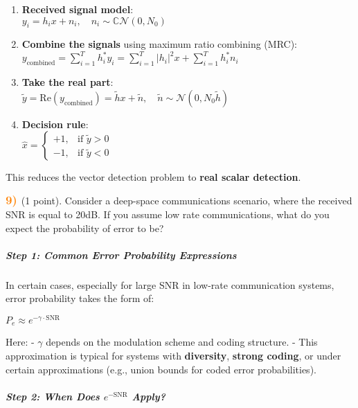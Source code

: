 \documentclass[11pt]{article}
\begin{document}
\begin{enumerate}
\def\labelenumi{\arabic{enumi}.}
\item
  \textbf{Received signal model}:\\
  \(y_i = h_i x + n_i, \quad n_i \sim \mathbb{C}\mathcal{N}(0, N_0)\)
\item
  \textbf{Combine the signals} using maximum ratio combining (MRC):\\
  \(y_{\text{combined}} = \sum_{i=1}^{T} h_i^* y_i = \sum_{i=1}^{T} |h_i|^2 x + \sum_{i=1}^{T} h_i^* n_i\)
\item
  \textbf{Take the real part}:\\
  \(\tilde{y} = \text{Re}(y_{\text{combined}}) = \tilde{h} x + \tilde{n}, \quad \tilde{n} \sim \mathcal{N}(0, N_0 \tilde{h})\)
\item
  \textbf{Decision rule}:\\
  \(\boxed{\hat{x} = \begin{cases} +1, & \text{if } \tilde{y} > 0 \\ -1, & \text{if } \tilde{y} < 0 \end{cases}}\)
\end{enumerate}

This reduces the vector detection problem to \textbf{real scalar
detection}.

    \(\color{orange} \large \textbf{9)}\) (1 point). Consider a deep-space
communications scenario, where the received SNR is equal to 20dB. If you
assume low rate communications, what do you expect the probability of
error to be?

    \subparagraph{\texorpdfstring{\textbf{Step 1: Common Error Probability
Expressions}}{Step 1: Common Error Probability Expressions}}\label{step-1-common-error-probability-expressions}

In certain cases, especially for large SNR in low-rate communication
systems, error probability takes the form of:

\(P_e \approx e^{-\gamma \cdot \text{SNR}}\)

Here: - \(\gamma\) depends on the modulation scheme and coding
structure. - This approximation is typical for systems with
\textbf{diversity}, \textbf{strong coding}, or under certain
approximations (e.g., union bounds for coded error probabilities).

\subparagraph{\texorpdfstring{\textbf{Step 2: When Does
\(e^{-\text{SNR}}\)
Apply?}}{Step 2: When Does e\^{}\{-\textbackslash text\{SNR\}\} Apply?}}\label{step-2-when-does-e-textsnr-apply}
\end{document}
